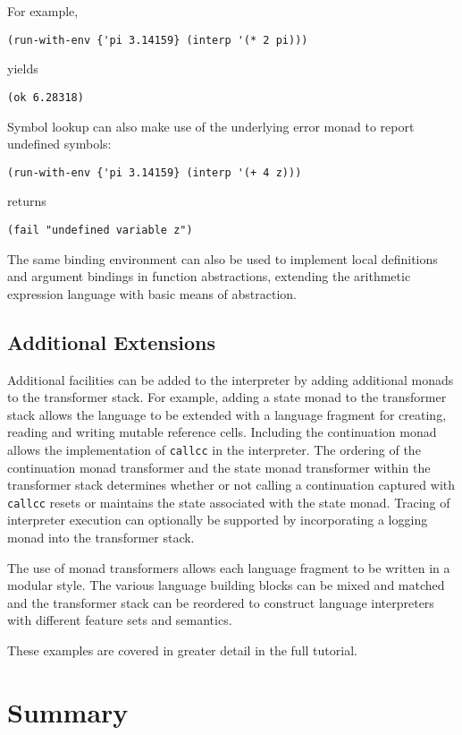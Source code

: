 \documentclass[natbib,10pt]{sigplanconf}
\begin{document}
\pagebreak

For example,
\begin{verbatim}
(run-with-env {'pi 3.14159} (interp '(* 2 pi)))
\end{verbatim}
yields 
\begin{verbatim}
(ok 6.28318)
\end{verbatim}
Symbol lookup can also make use of the underlying error monad
to report undefined symbols:
\begin{verbatim}
(run-with-env {'pi 3.14159} (interp '(+ 4 z)))
\end{verbatim}
returns
\begin{verbatim}
(fail "undefined variable z")
\end{verbatim}

The same binding environment can also be used to implement local
definitions and argument bindings in function abstractions, extending
the arithmetic expression language with basic means of abstraction.

\subsection{Additional Extensions}

Additional facilities can be added to the interpreter by adding
additional monads to the transformer stack. For example, adding a
state monad to the transformer stack allows the language to be
extended with a language fragment for creating, reading and writing
mutable reference cells. Including the continuation monad allows the
implementation of {\tt callcc} in the interpreter.  The ordering of
the continuation monad transformer and the state monad transformer
within the transformer stack determines whether or not calling a
continuation captured with {\tt callcc} resets or maintains the
state associated with the state monad. Tracing of interpreter 
execution can optionally be supported by incorporating a logging
monad into the transformer stack.

The use of monad transformers allows each language fragment to be
written in a modular style.  The various language building blocks can
be mixed and matched and the transformer stack can be reordered to
construct language interpreters with different feature sets and
semantics.

These examples are covered in greater detail in the full tutorial.

\section{Summary}
\end{document}
